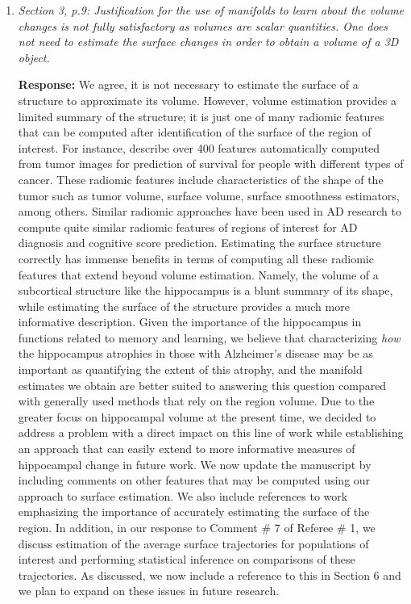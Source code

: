 \documentclass[12pt]{article}
\theoremstyle{definition}
\newcommand{\revision}[1]{\textcolor{blue}{#1}}
\begin{document}
\begin{enumerate}
\revision{While not considered in this manuscript, one interesting addition to the approach proposed here is the inclusion of the stronger assumption of monotonicity in the longitudinal changes experienced by the target manifold.} 

\item \textit{Section 3, p.9:    Justification for the use of manifolds to learn about the volume changes is not fully satisfactory as volumes are scalar quantities. One does not need to estimate the surface changes in order to obtain a volume of a 3D object.}

{\bf Response:} We agree, it is not necessary to estimate the surface of a structure to approximate its volume. However, volume estimation provides a limited summary of the structure; it is just one of many radiomic features that can be computed after identification of the surface of the region of interest. For instance, \cite{aerts2014decoding} describe over 400 features automatically computed from tumor images for prediction of survival for people with different types of cancer. These radiomic features include characteristics of the shape of the tumor such as tumor volume, surface volume, surface smoothness estimators, among others. Similar radiomic approaches have been used in AD research to compute quite similar radiomic features of regions of interest for AD diagnosis and cognitive score prediction. Estimating the surface structure correctly has immense benefits in terms of computing all these radiomic features that extend beyond volume estimation. Namely, the volume of a subcortical structure like the hippocampus is a blunt summary of its shape, while estimating the surface of the structure provides a much more informative description. Given the importance of the hippocampus in functions related to memory and learning, we believe that characterizing \textit{how} the hippocampus atrophies in those with Alzheimer's disease may be as important as quantifying the extent of this atrophy, and the manifold estimates we obtain are better suited to answering this question compared with generally used methods that rely on the region volume. Due to the greater focus on hippocampal volume at the present time, we decided to address a problem with a direct impact on this line of work while establishing an approach that can easily extend to more informative measures of hippocampal change in future work. We now update the manuscript by including comments on other features that may be computed using our approach to surface estimation. We also include references to work emphasizing the importance of accurately estimating the surface of the region. In addition, in our response to Comment \# 7 of Referee \# 1, we discuss estimation of the average surface trajectories for populations of interest and performing statistical inference on comparisons of these trajectories. As discussed, we now include a reference to this in Section 6 and we plan to expand on these issues in future research. 



\end{enumerate}
\end{document}
